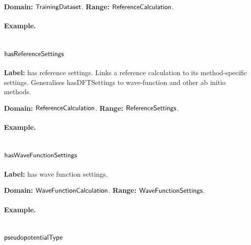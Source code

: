 \textbf{Domain:} $\mathsf{TrainingDataset}$.
\textbf{Range:} $\mathsf{ReferenceCalculation}$.

\paragraph{Example.}

\subsection{$\mathsf{hasReferenceSettings}$}
\label{sec:term-hasReferenceSettings}

\textbf{Label:} has reference settings.
Links a reference calculation to its method-specific settings. Generalises hasDFTSettings to wave-function and other ab initio methods.

\textbf{Domain:} $\mathsf{ReferenceCalculation}$.
\textbf{Range:} $\mathsf{ReferenceSettings}$.

\paragraph{Example.}

\subsection{$\mathsf{hasWaveFunctionSettings}$}
\label{sec:term-hasWaveFunctionSettings}

\textbf{Label:} has wave function settings.

\textbf{Domain:} $\mathsf{WaveFunctionCalculation}$.
\textbf{Range:} $\mathsf{WaveFunctionSettings}$.

\paragraph{Example.}

\subsection{$\mathsf{pseudopotentialType}$}
\label{sec:term-pseudopotentialType}

